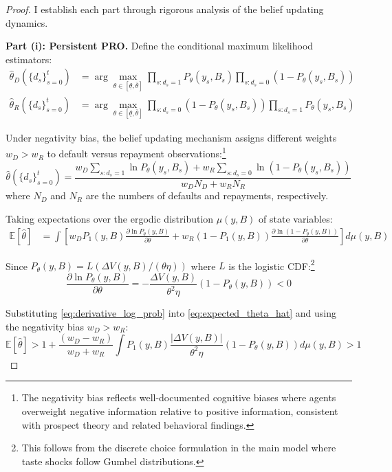 \documentclass[12pt]{article}
\theoremstyle{plain}
\begin{document}
\begin{proof}
I establish each part through rigorous analysis of the belief updating dynamics.

	\textbf{Part (i): Persistent PRO.}
	Define the conditional maximum likelihood estimators:
	\begin{align}
		\hat{\theta}_D(\{d_s\}_{s=0}^t) & = \arg\max_{\theta \in [\underline{\theta}, \bar{\theta}]} \prod_{s: d_s=1} P_\theta(y_s, B_s) \prod_{s: d_s=0} (1-P_\theta(y_s, B_s)) \label{eq:mle_default} \\
		\hat{\theta}_R(\{d_s\}_{s=0}^t) & = \arg\max_{\theta \in [\underline{\theta}, \bar{\theta}]} \prod_{s: d_s=0} (1-P_\theta(y_s, B_s)) \prod_{s: d_s=1} P_\theta(y_s, B_s) \label{eq:mle_repay}
	\end{align}

	Under negativity bias, the belief updating mechanism assigns different weights
	$w_D > w_R$ to default versus repayment observations:\footnote{The negativity
		bias reflects well-documented cognitive biases where agents overweight negative
		information relative to positive information, consistent with prospect theory
		and related behavioral findings.}
	\begin{equation}
		\hat{\theta}(\{d_s\}_{s=0}^t) = \frac{w_D \sum_{s: d_s=1} \ln P_\theta(y_s, B_s) + w_R \sum_{s: d_s=0} \ln(1-P_\theta(y_s, B_s))}{w_D N_D + w_R N_R} \label{eq:weighted_mle}
	\end{equation}
	where $N_D$ and $N_R$ are the numbers of defaults and repayments, respectively.

	Taking expectations over the ergodic distribution $\mu(y,B)$ of state
	variables:
	\begin{align}
		\mathbb{E}[\hat{\theta}] & = \int \left[ w_D P_1(y,B) \frac{\partial \ln P_\theta(y,B)}{\partial \theta} + w_R (1-P_1(y,B)) \frac{\partial \ln(1-P_\theta(y,B))}{\partial \theta} \right] d\mu(y,B) \label{eq:expected_theta_hat}
	\end{align}

	Since $P_\theta(y,B) = L(\Delta V(y,B)/(\theta\eta))$ where $L$ is the logistic
	CDF:\footnote{This follows from the discrete choice formulation in the main
		model where taste shocks follow Gumbel distributions.}
	\begin{equation}
		\frac{\partial \ln P_\theta(y,B)}{\partial \theta} = -\frac{\Delta V(y,B)}{\theta^2\eta} (1-P_\theta(y,B)) < 0 \label{eq:derivative_log_prob}
	\end{equation}

	Substituting \eqref{eq:derivative_log_prob} into \eqref{eq:expected_theta_hat}
	and using the negativity bias $w_D > w_R$:
	\begin{equation}
		\mathbb{E}[\hat{\theta}] > 1 + \frac{(w_D - w_R)}{w_D + w_R} \int P_1(y,B) \frac{|\Delta V(y,B)|}{\theta^2\eta} (1-P_\theta(y,B)) d\mu(y,B) > 1 \label{eq:persistent_pessimism}
	\end{equation}


\end{proof}
\end{document}
